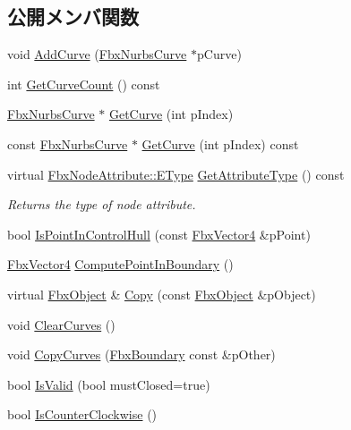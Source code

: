 \subsection*{公開メンバ関数}
\begin{DoxyCompactItemize}
\item 
void \hyperlink{class_fbx_boundary_af94f173acd55d7d5f285f8539bbb48e4}{Add\+Curve} (\hyperlink{class_fbx_nurbs_curve}{Fbx\+Nurbs\+Curve} $\ast$p\+Curve)
\item 
int \hyperlink{class_fbx_boundary_adcd0d41aa9a5804cd74ed14b6b8f6f8a}{Get\+Curve\+Count} () const
\item 
\hyperlink{class_fbx_nurbs_curve}{Fbx\+Nurbs\+Curve} $\ast$ \hyperlink{class_fbx_boundary_acbf7b338d8b90d6cd52e7c39faa8b648}{Get\+Curve} (int p\+Index)
\item 
const \hyperlink{class_fbx_nurbs_curve}{Fbx\+Nurbs\+Curve} $\ast$ \hyperlink{class_fbx_boundary_a1f9aac3b37beac6639afa97c79e45358}{Get\+Curve} (int p\+Index) const
\item 
virtual \hyperlink{class_fbx_node_attribute_a08e1669d3d1a696910756ab17de56d6a}{Fbx\+Node\+Attribute\+::\+E\+Type} \hyperlink{class_fbx_boundary_a093be9c6c0c0f13a337e9b6815aed9d0}{Get\+Attribute\+Type} () const
\begin{DoxyCompactList}\small\item\em Returns the type of node attribute. \end{DoxyCompactList}\item 
bool \hyperlink{class_fbx_boundary_ad319a0f4511c35710c24b543d30bbee2}{Is\+Point\+In\+Control\+Hull} (const \hyperlink{class_fbx_vector4}{Fbx\+Vector4} \&p\+Point)
\item 
\hyperlink{class_fbx_vector4}{Fbx\+Vector4} \hyperlink{class_fbx_boundary_a615c36267401342800e00befefa50f6c}{Compute\+Point\+In\+Boundary} ()
\item 
virtual \hyperlink{class_fbx_object}{Fbx\+Object} \& \hyperlink{class_fbx_boundary_a6fe59f45c17eeebbabaeff235058ac70}{Copy} (const \hyperlink{class_fbx_object}{Fbx\+Object} \&p\+Object)
\item 
void \hyperlink{class_fbx_boundary_aa1c12f34cb325c5a337fa383f0860e06}{Clear\+Curves} ()
\item 
void \hyperlink{class_fbx_boundary_ae41addb147733da9216a785bc6d003c3}{Copy\+Curves} (\hyperlink{class_fbx_boundary}{Fbx\+Boundary} const \&p\+Other)
\item 
bool \hyperlink{class_fbx_boundary_a4ecaec2f4194b5ba045c14ec0549d10e}{Is\+Valid} (bool must\+Closed=true)
\item 
bool \hyperlink{class_fbx_boundary_a025f682e72db299620e30eeeebdd1ea7}{Is\+Counter\+Clockwise} ()
\end{DoxyCompactItemize}
